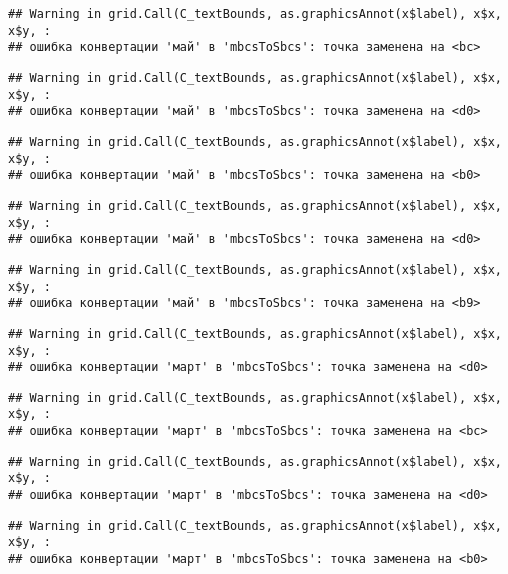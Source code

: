 \documentclass[
]{article}
\begin{document}
\begin{verbatim}
## Warning in grid.Call(C_textBounds, as.graphicsAnnot(x$label), x$x, x$y, :
## ошибка конвертации 'май' в 'mbcsToSbcs': точка заменена на <bc>
\end{verbatim}

\begin{verbatim}
## Warning in grid.Call(C_textBounds, as.graphicsAnnot(x$label), x$x, x$y, :
## ошибка конвертации 'май' в 'mbcsToSbcs': точка заменена на <d0>
\end{verbatim}

\begin{verbatim}
## Warning in grid.Call(C_textBounds, as.graphicsAnnot(x$label), x$x, x$y, :
## ошибка конвертации 'май' в 'mbcsToSbcs': точка заменена на <b0>
\end{verbatim}

\begin{verbatim}
## Warning in grid.Call(C_textBounds, as.graphicsAnnot(x$label), x$x, x$y, :
## ошибка конвертации 'май' в 'mbcsToSbcs': точка заменена на <d0>
\end{verbatim}

\begin{verbatim}
## Warning in grid.Call(C_textBounds, as.graphicsAnnot(x$label), x$x, x$y, :
## ошибка конвертации 'май' в 'mbcsToSbcs': точка заменена на <b9>
\end{verbatim}

\begin{verbatim}
## Warning in grid.Call(C_textBounds, as.graphicsAnnot(x$label), x$x, x$y, :
## ошибка конвертации 'март' в 'mbcsToSbcs': точка заменена на <d0>
\end{verbatim}

\begin{verbatim}
## Warning in grid.Call(C_textBounds, as.graphicsAnnot(x$label), x$x, x$y, :
## ошибка конвертации 'март' в 'mbcsToSbcs': точка заменена на <bc>
\end{verbatim}

\begin{verbatim}
## Warning in grid.Call(C_textBounds, as.graphicsAnnot(x$label), x$x, x$y, :
## ошибка конвертации 'март' в 'mbcsToSbcs': точка заменена на <d0>
\end{verbatim}

\begin{verbatim}
## Warning in grid.Call(C_textBounds, as.graphicsAnnot(x$label), x$x, x$y, :
## ошибка конвертации 'март' в 'mbcsToSbcs': точка заменена на <b0>
\end{verbatim}
\end{document}
